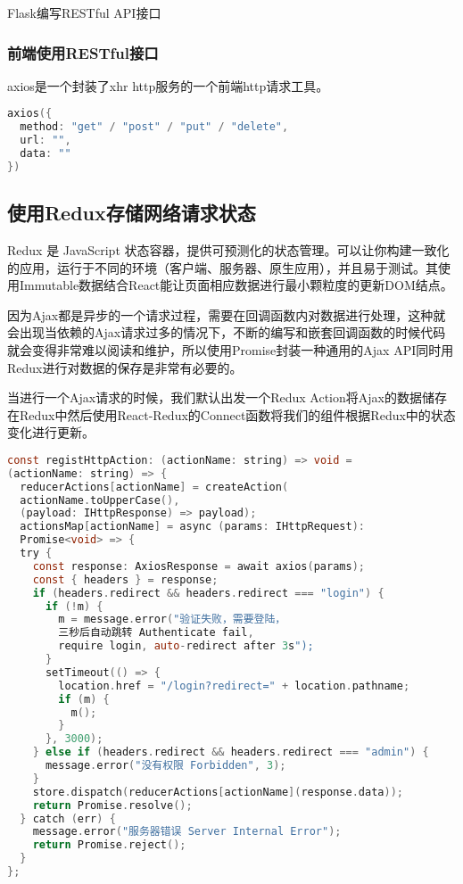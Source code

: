 \begin{center}
	{\small Flask编写RESTful API接口}
\end{center}

\subsubsection{前端使用RESTful接口}

axios是一个封装了xhr http服务的一个前端http请求工具。

\begin{lstlisting}[language=C]
axios({
  method: "get" / "post" / "put" / "delete",
  url: "",
  data: ""
})
\end{lstlisting}

\subsection{使用Redux存储网络请求状态}

Redux 是 JavaScript 状态容器，提供可预测化的状态管理。可以让你构建一致化的应用，运行于不同的环境（客户端、服务器、原生应用），并且易于测试。其使用Immutable数据结合React能让页面相应数据进行最小颗粒度的更新DOM结点。

因为Ajax都是异步的一个请求过程，需要在回调函数内对数据进行处理，这种就会出现当依赖的Ajax请求过多的情况下，不断的编写和嵌套回调函数的时候代码就会变得非常难以阅读和维护，所以使用Promise封装一种通用的Ajax API同时用Redux进行对数据的保存是非常有必要的。

当进行一个Ajax请求的时候，我们默认出发一个Redux Action将Ajax的数据储存在Redux中然后使用React-Redux的Connect函数将我们的组件根据Redux中的状态变化进行更新。

\begin{lstlisting}[language=C]
const registHttpAction: (actionName: string) => void = 
(actionName: string) => {
  reducerActions[actionName] = createAction(
  actionName.toUpperCase(), 
  (payload: IHttpResponse) => payload);
  actionsMap[actionName] = async (params: IHttpRequest): 
  Promise<void> => {
  try {
    const response: AxiosResponse = await axios(params);
    const { headers } = response;
    if (headers.redirect && headers.redirect === "login") {
      if (!m) {
        m = message.error("验证失败，需要登陆，
        三秒后自动跳转 Authenticate fail, 
        require login, auto-redirect after 3s");
      }
      setTimeout(() => {
        location.href = "/login?redirect=" + location.pathname;
        if (m) {
          m();
        }
      }, 3000);
    } else if (headers.redirect && headers.redirect === "admin") {
      message.error("没有权限 Forbidden", 3);
    }
    store.dispatch(reducerActions[actionName](response.data));
    return Promise.resolve();
  } catch (err) {
    message.error("服务器错误 Server Internal Error");
    return Promise.reject();
  }
};
\end{lstlisting}

